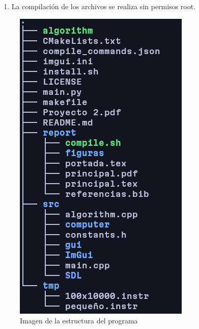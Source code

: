 \documentclass{report}
\begin{document}
\begin{enumerate}
\item La compilación de los archivos se realiza sin permisos root.

\end{enumerate}

\begin{figure}[h]
	\centering
	\includegraphics[width=0.8\linewidth]{figuras/estructura.png}
	\caption{Imagen de la estructura del programa }
	\label{fig:estructura}
\end{figure}
\end{document}
